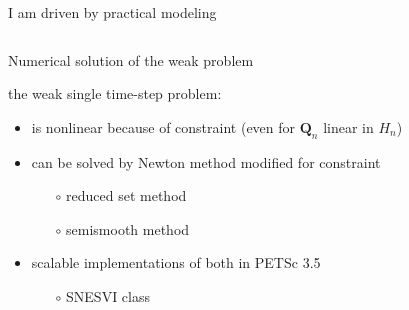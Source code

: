 \documentclass{beamer}
\newcommand\bQ{\mathbf{Q}}
\begin{document}
\begin{frame}{I am driven by practical modeling}
\begin{columns}
\begin{column}{0.5\textwidth}
\begin{center}
\end{center}
\end{column}
\end{columns}
\end{frame}


\begin{frame}{Numerical solution of the weak problem}

the weak single time-step problem:
\begin{itemize}
\item is nonlinear because of constraint (even for $\bQ_n$ linear in $H_n$)
\item can be solved by Newton method modified for constraint
  \begin{itemize}
  \item[$\circ$]  reduced set method
  \item[$\circ$]  semismooth method
  \end{itemize}
\item scalable implementations of both in PETSc 3.5
  \begin{itemize}
  \item[$\circ$]  SNESVI class
  \end{itemize}
\end{itemize}
\end{frame}
\end{document}
